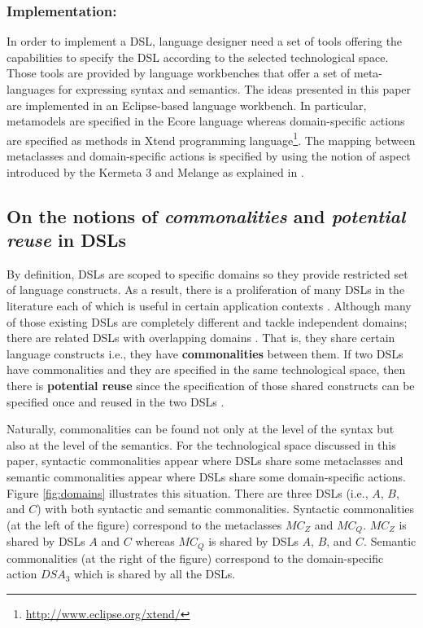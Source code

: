 \vspace{-3mm}
\subsubsection{Implementation:} In order to implement a DSL, language designer need a set of tools offering the capabilities to specify the DSL according to the selected technological space. Those tools are provided by language workbenches that offer a set of meta-languages for expressing syntax and semantics. The ideas presented in this paper are implemented in an Eclipse-based language workbench. In particular, metamodels are specified in the Ecore language whereas domain-specific actions are specified as methods in Xtend programming language\footnote{\url{http://www.eclipse.org/xtend/}}. The mapping between metaclasses and domain-specific actions is specified by using the notion of aspect introduced by the Kermeta 3 and Melange as explained in \cite{degueule:2015}. 

\subsection{On the notions of \textit{commonalities} and \textit{potential reuse} in DSLs}

By definition, DSLs are scoped to specific domains so they provide restricted set of language constructs. As a result, there is a proliferation of many DSLs in the literature each of which is useful in certain application contexts \cite{Mernik:2005b}. Although many of those existing DSLs are completely different and tackle independent domains; there are related DSLs with overlapping domains \cite[p. 60-61]{voelter:2013}. That is, they share certain language constructs i.e., they have \textbf{commonalities} between them. If two DSLs have commonalities and they are specified in the same technological space, then there is \textbf{potential reuse} since the specification of those shared constructs can be specified once and reused in the two DSLs \cite[p. 60-61]{voelter:2013}.

Naturally, commonalities can be found not only at the level of the syntax but also at the level of the semantics. For the technological space discussed in this paper, syntactic commonalities appear where DSLs share some metaclasses and semantic commonalities appear where DSLs share some domain-specific actions. Figure \ref{fig:domains} illustrates this situation. There are three DSLs (i.e., $A$, $B$, and $C$) with both syntactic and semantic commonalities. Syntactic commonalities (at the left of the figure) correspond to the metaclasses $MC_Z$ and $MC_Q$. $MC_Z$ is shared by DSLs $A$ and $C$ whereas $MC_Q$ is shared by DSLs $A$, $B$, and $C$. Semantic commonalities (at the right of the figure) correspond to the domain-specific action $DSA_3$ which is shared by all the DSLs. 

